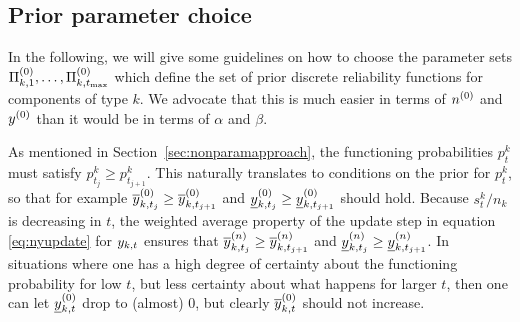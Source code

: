 \documentclass[12pt, a4paper]{elsarticle}
\def\tmax{t_\text{max}}
\newcommand{\ptk}{p^k_t}
\begin{document}
\subsection{Prior parameter choice}
In the following, we will give some guidelines on how to choose the parameter sets $\PkZi{1}, \ldots, \PkZi{\tmax}$
which define the set of prior discrete reliability functions for components of type $k$.
We advocate that this is much easier in terms of $n^{(0)}$ and $y^{(0)}$ than it would be in terms of $\alpha$ and $\beta$.

As mentioned in Section~\ref{sec:nonparamapproach}, the functioning probabilities $\ptk$
must satisfy $p^k_{t_j} \ge p^k_{t_{j+1}}$.%
This naturally translates to conditions on the prior for $\ptk$,
so that for example 
$\overline{y}^{(0)}_{k,t_j} \ge \overline{y}^{(0)}_{k,t_{j+1}}$ and $\underline{y}^{(0)}_{k,t_j} \ge \underline{y}^{(0)}_{k,t_{j+1}}$ should hold.
Because $s^k_t/n_k$ is decreasing in $t$, the weighted average property of the update step in
equation \eqref{eq:nyupdate} for $y_{k,t}$ ensures that 
$\overline{y}^{(n)}_{k,t_j} \ge \overline{y}^{(n)}_{k,t_{j+1}}$ and $\underline{y}^{(n)}_{k,t_j} \ge \underline{y}^{(n)}_{k,t_{j+1}}$.
In situations where one has a high degree of certainty about the functioning probability for low $t$,
but less certainty about what happens for larger $t$,
then one can let $\underline{y}^{(0)}_{k,t}$ drop to (almost) 0, but clearly $\overline{y}^{(0)}_{k,t}$ should not increase.
\end{document}
